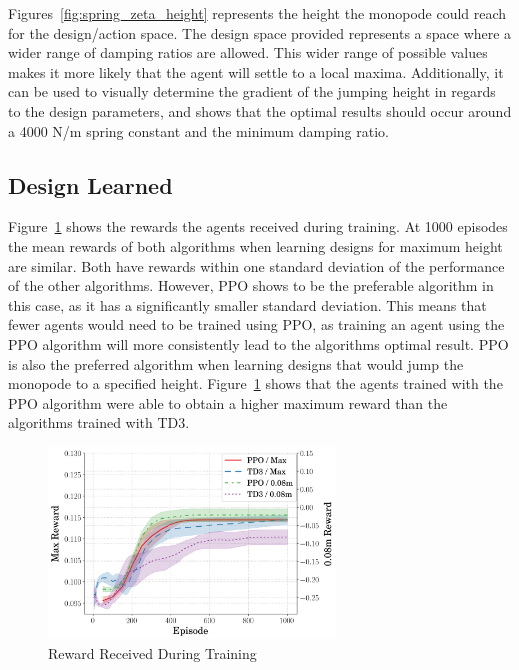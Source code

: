 \documentclass[10pt,twocolumn,letterpaper]{article}
\begin{document}
Figures~\ref{fig:spring_zeta_height} represents the height the monopode could reach for the design/action space. The design space provided represents a space where a wider range of damping ratios are allowed. This wider range of possible values makes it more likely that the agent will settle to a local maxima. Additionally, it can be used to visually determine the gradient of the jumping height in regards to the design parameters, and shows that the optimal results should occur around a 4000 N/m spring constant and the minimum damping ratio.

\subsection{Design Learned}

Figure~\ref{fig:rew_vs_step} shows the rewards the agents received during training. 
At 1000 episodes the mean rewards of both algorithms when learning designs for maximum height are similar. Both have rewards within one standard deviation of the performance of the other algorithms. However, PPO shows to be the preferable algorithm in this case, as it has a significantly smaller standard deviation.
This means that fewer agents would need to be trained using PPO, as training an agent using the PPO algorithm will more consistently lead to the algorithms optimal result. PPO is also the preferred algorithm when learning designs that would jump the monopode to a specified height. Figure~\ref{fig:rew_vs_step} shows that the agents trained with the PPO algorithm were able to obtain a higher maximum reward than the algorithms trained with TD3.

\begin{figure}[t]
\begin{center}
        \includegraphics[width = 3in]{figures/ppo_vs_td3/avg_rew_comp.png}
        \caption{Reward Received During Training}
        \label{fig:rew_vs_step}
\end{center}
\end{figure}
%
\end{document}
